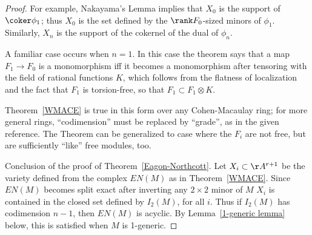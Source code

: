 \begin{proof}
For example, Nakayama's Lemma implies that $X_{0}$ is the support of $\coker \phi_{1}$; thus $X_{0}$ is the set defined by the $\rank F_{0}$-sized minors of $\phi_{1}$. Similarly, 
$X_{n}$ is the support of the cokernel of the dual of $\phi_{n}$. 

A familiar case occurs when  $n=1$. In this case the theorem says that a map $F_1\to F_0$ is a monomorphism iff it becomes a monomorphism after tensoring with the field of rational functions $K$, which follows from the flatness of
localization and the fact that $F_1$ is torsion-free, so that
$F_1 \subset F_1 \otimes K$. 

\begin{fact}
Theorem~\ref{WMACE} is true in this form over any Cohen-Macaulay ring; for more general
rings, ``codimension'' must be replaced by ``grade'', as in the given reference.
The Theorem can be generalized
to case where the $F_i$ are not free, but are sufficiently ``like'' free modules, too.
\end{fact}

Conclusion of the proof of Theorem~\ref{Eagon-Northcott}.
Let $X_{i}\subset \AA^{r+1}$ be the variety defined from the complex $EN(M)$ as in 
Theorem~\ref{WMACE}. Since $EN(M)$ becomes split exact after inverting any $2\times 2$ minor of $M$
$X_{i}$ is
contained in the closed set defined by $I_{2}(M)$, for all $i$. Thus if $I_{2}(M)$ has codimension $n-1$,
then $EN(M)$ is acyclic. By Lemma~\ref{1-generic lemma} below, this is satisfied when $M$ is 1-generic.
\end {proof}

